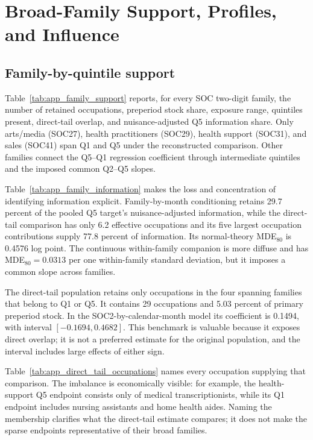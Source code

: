 \section{Broad-Family Support, Profiles, and Influence}\label{app:families}

\subsection{Family-by-quintile support}

Table~\ref{tab:app_family_support} reports, for every SOC two-digit family, the number of retained occupations, preperiod stock share, exposure range, quintiles present, direct-tail overlap, and nuisance-adjusted Q5 information share.  Only arts/media (SOC27), health practitioners (SOC29), health support (SOC31), and sales (SOC41) span Q1 and Q5 under the reconstructed comparison.  Other families connect the Q5--Q1 regression coefficient through intermediate quintiles and the imposed common Q2--Q5 slopes.



Table~\ref{tab:app_family_information} makes the loss and concentration of identifying information explicit.  Family-by-month conditioning retains 29.7 percent of the pooled Q5 target's nuisance-adjusted information, while the direct-tail comparison has only 6.2 effective occupations and its five largest occupation contributions supply 77.8 percent of information.  Its normal-theory MDE$_{80}$ is 0.4576 log point.  The continuous within-family companion is more diffuse and has MDE$_{80}=0.0313$ per one within-family standard deviation, but it imposes a common slope across families.



The direct-tail population retains only occupations in the four spanning families that belong to Q1 or Q5.  It contains 29 occupations and 5.03 percent of primary preperiod stock.  In the SOC2-by-calendar-month model its coefficient is 0.1494, with interval $[-0.1694,0.4682]$.  This benchmark is valuable because it exposes direct overlap; it is not a preferred estimate for the original population, and the interval includes large effects of either sign.

Table~\ref{tab:app_direct_tail_occupations} names every occupation supplying
that comparison.  The imbalance is economically visible: for example, the
health-support Q5 endpoint consists only of medical transcriptionists, while
its Q1 endpoint includes nursing assistants and home health aides.  Naming the
membership clarifies what the direct-tail estimate compares; it does not make
the sparse endpoints representative of their broad families.

